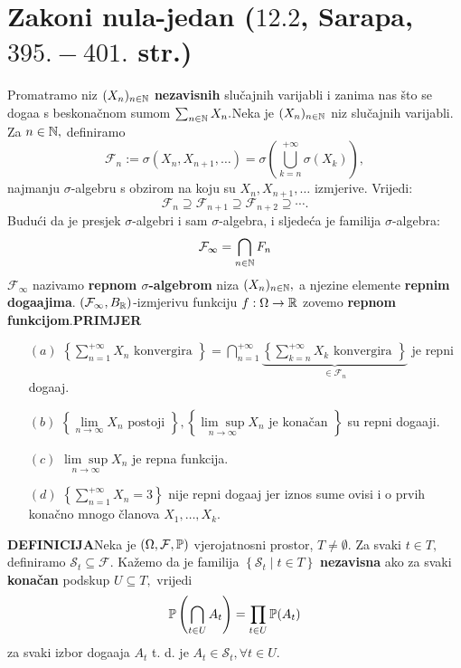 \documentclass{article}
\newcommand{\mylimsup}{\underset{n\to\infty}{\lim\sup}}
\begin{document}
\section{Zakoni nula-jedan (\textsection \(12.2\), Sarapa, \(395.-401.\) str.)}
Promatramo niz \((X_n)_{n\in\Bbb N}\) \textbf{nezavisnih} slučajnih varijabli i zanima nas što se doga\dj{}a s beskonačnom sumom \(\sum_{n\in\Bbb N}X_n.\)\newline Neka je \((X_n)_{n\in\Bbb N}\) niz slučajnih varijabli. Za \(n\in\Bbb N,\)  definiramo \[\mathcal F_n:=\sigma\left(X_n,X_{n+1},\ldots\right)=\sigma\left(\bigcup_{k=n}^{+\infty}\sigma(X_k)\right),\] najmanju \(\sigma\)-algebru s obzirom na koju su \(X_n,X_{n+1},\ldots\) izmjerive. Vrijedi: \[\mathcal F_n\supseteq\mathcal F_{n+1}\supseteq\mathcal F_{n+2}\supseteq\cdots.\] Budući da je presjek \(\sigma\)-algebri i sam \(\sigma\)-algebra, i sljedeća je familija \(\sigma\)-algebra: \[\mathcal F_\infty=\bigcap_{n\in\Bbb N} F_n\] \(\mathcal F_\infty\) nazivamo \textbf{repnom \(\sigma\)-algebrom} niza \((X_n)_{n\in\Bbb N},\) a njezine elemente \textbf{repnim doga\dj{}ajima}. \newline \(\left(\mathcal F_\infty,B_{\Bbb R}\right)\)-izmjerivu funkciju \(f:\Omega\to\Bbb R\) zovemo \textbf{repnom funkcijom}.\newline\newline\textbf{PRIMJER}\newline\begin{enumerate}
    \item[\((a)\)] \(\left\{\sum\limits_{n=1}^{+\infty}X_n\text{ konvergira }\right\}=\displaystyle\bigcap_{n=1}^{+\infty}\underbrace{\left\{\sum_{k=n}^{+\infty}X_k\text{ konvergira }\right\}}_{\in\mathcal F_n}\) je repni doga\dj{}aj.
    \item[\((b)\)] \(\left\{\lim\limits_{n\to\infty}X_n\text{ postoji }\right\},\left\{\mylimsup X_n\text{ je konačan }\right\}\) su repni doga\dj{}aji.
    \item[\((c)\)] \(\mylimsup X_n\) je repna funkcija. 
    \item[\((d)\)] \(\left\{\sum\limits_{n=1}^{+\infty}X_n=3\right\}\) nije repni doga\dj{}aj jer iznos sume ovisi i o prvih konačno mnogo članova \(X_1,\ldots,X_k.\) 
\end{enumerate}  
\textbf{DEFINICIJA}\newline Neka je \(\left(\Omega,\mathcal F,\Bbb P\right)\) vjerojatnosni prostor, \(T\ne\emptyset.\) Za svaki \(t\in T,\) definiramo \(\mathcal S_t\subseteq\mathcal F.\) Kažemo da je familija  \(\left\{\mathcal S_t\mid t\in T\right\}\) \textbf{nezavisna} ako za svaki \textbf{konačan} podskup \(U\subseteq T,\) vrijedi \[\Bbb P\left(\bigcap_{t\in U}A_t\right)=\prod_{t\in U}\Bbb P(A_t)\] za svaki izbor doga\dj{}aja \(A_t\) t. d. je \(A_t\in\mathcal S_t,\forall t\in U.\)\newline\newline 
\end{document}
